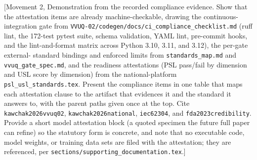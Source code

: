 [Movement 2, Demonstration from the recorded compliance evidence. Show that the
attestation items are already machine-checkable, drawing the continuous-integration
gate from \texttt{VVUQ-02/codegen/docs/ci\_compliance\_checklist.md} (ruff lint,
the 172-test pytest suite, schema validation, YAML lint, pre-commit hooks, and the
lint-and-format matrix across Python 3.10, 3.11, and 3.12), the per-gate external-
standard bindings and enforced limits from \texttt{standards\_map.md} and
\texttt{vvuq\_gate\_spec.md}, and the readiness attestations (PSL pass/fail by
dimension and USL score by dimension) from the national-platform
\texttt{psl\_usl\_standards.tex}. Present the compliance items in one table that
maps each attestation clause to the artifact that evidences it and the standard it
answers to, with the parent paths given once at the top. Cite
\texttt{kawchak2026vvuq02}, \texttt{kawchak2026national}, \texttt{iec62304}, and
\texttt{fda2023credibility}. Provide a short model attestation block (a quoted
specimen the future full paper can refine) so the statutory form is concrete, and
note that no executable code, model weights, or training data sets are filed with
the attestation; they are referenced, per
\texttt{sections/supporting\_documentation.tex}.]

